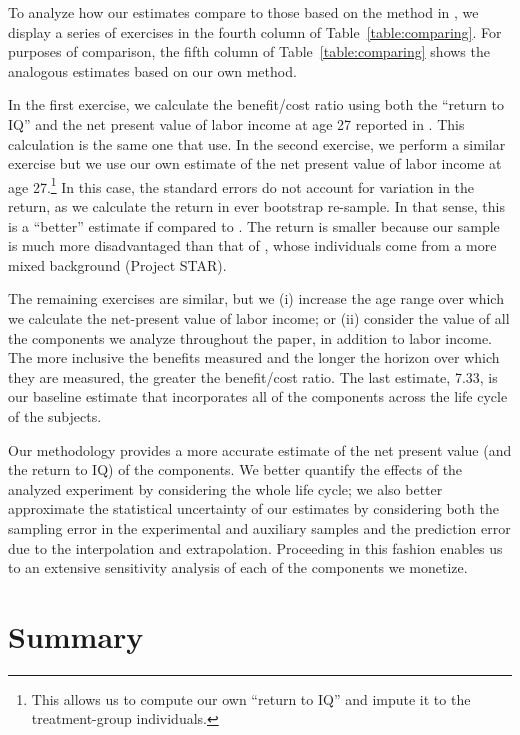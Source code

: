 To analyze how our estimates compare to those based on the method in \citet{Kline_Walters_2016_QJE}, we display a series of exercises in the fourth column of Table~\ref{table:comparing}. For purposes of comparison, the fifth column of Table~\ref{table:comparing} shows the analogous estimates based on our own method.

In the first exercise, we calculate the benefit/cost ratio using both the ``return to IQ'' and the net present value of labor income at age 27 reported in \citet{Chetty_Friedman_etal_2011_QJoE}. This calculation is the same one that \citet{Kline_Walters_2016_QJE} use. In the second exercise, we perform a similar exercise but we use our own estimate of the net present value of labor income at age 27.\footnote{This allows us to compute our own ``return to IQ'' and impute it to the treatment-group individuals.} In this case, the standard errors do not account for variation in the return, as we calculate the return in ever bootstrap re-sample. In that sense, this is a ``better'' estimate if compared to \citet{Kline_Walters_2016_QJE}. The return is smaller because our sample is much more disadvantaged than that of \citet{Chetty_Friedman_etal_2011_QJoE}, whose individuals come from a more mixed background (Project STAR). 

The remaining exercises are similar, but we (i) increase the age range over which we calculate the net-present value of labor income; or (ii) consider the value of all the components we analyze throughout the paper, in addition to labor income. The more inclusive the benefits measured and the longer the horizon over which they are measured, the greater the benefit/cost ratio. The last estimate, 7.33, is our baseline estimate that incorporates all of the components across the life cycle of the subjects. 

Our methodology provides a more accurate estimate of the net present value (and the return to IQ) of the components. We better quantify the effects of the analyzed experiment by considering the whole life cycle; we also better approximate the statistical uncertainty of our estimates by considering both the sampling error in the experimental and auxiliary samples and the prediction error due to the interpolation and extrapolation. Proceeding in this fashion enables us to an extensive sensitivity analysis of each of the components we monetize.

\section{Summary} \label{section:conclusion}

